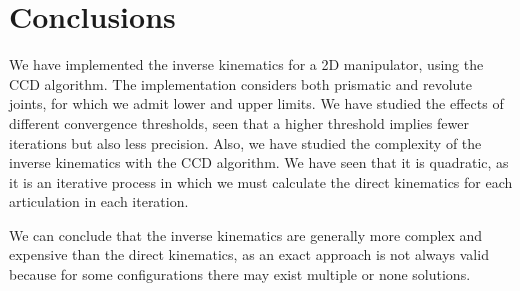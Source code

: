 
\section{Conclusions}
We have implemented the inverse kinematics for a 2D manipulator, using the CCD algorithm. The implementation considers both prismatic and revolute joints, for which we admit lower and upper limits.
We have studied the effects of different convergence thresholds, seen that a higher threshold implies fewer iterations but also less precision.
Also, we have studied the complexity of the inverse kinematics with the CCD algorithm. We have seen that it is quadratic, as it is an iterative process in which we must calculate the direct kinematics for each articulation in each iteration.

\bigskip We can conclude that the inverse kinematics are generally more complex and expensive than the direct kinematics, as an exact approach is not always valid because for some configurations there may exist multiple or none solutions. 

